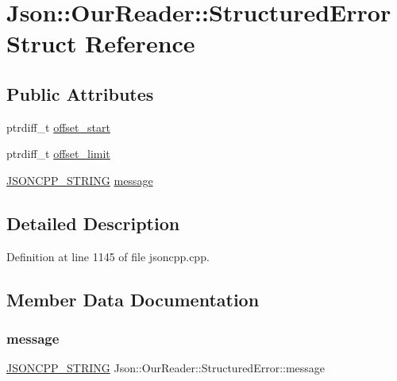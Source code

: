 \hypertarget{struct_json_1_1_our_reader_1_1_structured_error}{}\section{Json\+:\+:Our\+Reader\+:\+:Structured\+Error Struct Reference}
\label{struct_json_1_1_our_reader_1_1_structured_error}
\subsection*{Public Attributes}
\begin{DoxyCompactItemize}
\item 
ptrdiff\+\_\+t \hyperlink{struct_json_1_1_our_reader_1_1_structured_error_a102677698afb8177c985e72dafe72b15}{offset\+\_\+start}
\item 
ptrdiff\+\_\+t \hyperlink{struct_json_1_1_our_reader_1_1_structured_error_a15491a751a39c5153af04e68b1d0abb9}{offset\+\_\+limit}
\item 
\hyperlink{config_8h_a1e723f95759de062585bc4a8fd3fa4be}{J\+S\+O\+N\+C\+P\+P\+\_\+\+S\+T\+R\+I\+NG} \hyperlink{struct_json_1_1_our_reader_1_1_structured_error_a9d0b9986bf765d067dfcf2f971a450d1}{message}
\end{DoxyCompactItemize}


\subsection{Detailed Description}


Definition at line 1145 of file jsoncpp.\+cpp.



\subsection{Member Data Documentation}
\hypertarget{struct_json_1_1_our_reader_1_1_structured_error_a9d0b9986bf765d067dfcf2f971a450d1}{}\label{struct_json_1_1_our_reader_1_1_structured_error_a9d0b9986bf765d067dfcf2f971a450d1} 
\subsubsection{\texorpdfstring{message}{message}}
{\footnotesize\ttfamily \hyperlink{config_8h_a1e723f95759de062585bc4a8fd3fa4be}{J\+S\+O\+N\+C\+P\+P\+\_\+\+S\+T\+R\+I\+NG} Json\+::\+Our\+Reader\+::\+Structured\+Error\+::message}



